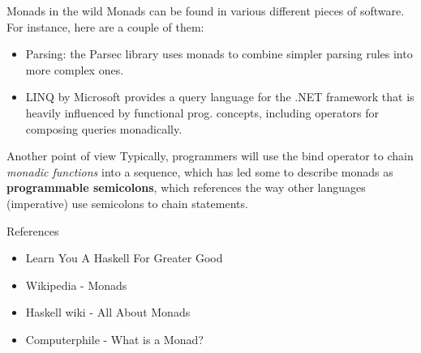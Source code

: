 \documentclass{beamer}
\begin{document}
\begin{frame}[fragile]{Monads in the wild}
    Monads can be found in various different pieces of software. For
    instance, here are a couple of them:

    \bigbreak
    \begin{itemize}
        \setlength \itemsep{1em}
        \item Parsing: the Parsec library uses monads to combine simpler
              parsing rules into more complex ones.
        \item LINQ by Microsoft provides a query language for the .NET
              framework that is heavily influenced by functional prog.
              concepts, including operators for composing queries
              monadically.
    \end{itemize}
\end{frame}

\begin{frame}[fragile]{Another point of view}
    Typically, programmers will use the bind operator to chain
    \textit{monadic functions} into a sequence, which has led
    some to describe monads as \textbf{programmable semicolons},
    which references the way other languages (imperative) use
    semicolons to chain statements.
\end{frame}

\begin{frame}[fragile]{References}
    \begin{itemize}
        \item Learn You A Haskell For Greater Good
        \item Wikipedia - Monads
        \item Haskell wiki - All About Monads
        \item Computerphile - What is a Monad?
    \end{itemize}
\end{frame}
\end{document}
